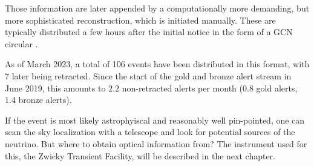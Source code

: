Those information are later appended by a computationally more demanding, but more sophisticated reconstruction, which is initiated manually. These are typically distributed a few hours after the initial notice in the form of a GCN circular \cite{Tung2019}.

As of March 2023, a total of 106 events have been distributed in this format, with 7 later being retracted. Since the start of the gold and bronze alert stream in June 2019, this amounts to $2.2$ non-retracted alerts per month (0.8 gold alerts, 1.4 bronze alerts).

If the event is most likely astrophyiscal and reasonably well pin-pointed, one can scan the sky localization with a telescope and look for potential sources of the neutrino. But where to obtain optical information from? The instrument used for this, the Zwicky Transient Facility, will be described in the next chapter.